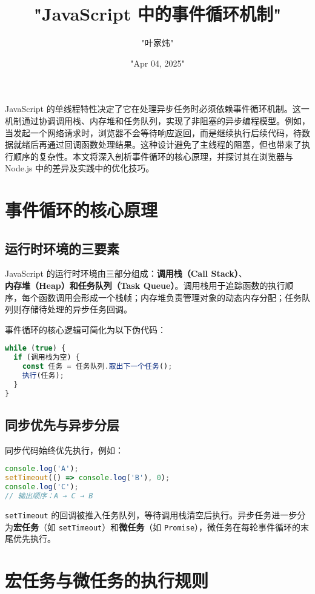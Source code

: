 \title{"JavaScript 中的事件循环机制"}
\author{"叶家炜"}
\date{"Apr 04, 2025"}
\maketitle
JavaScript 的单线程特性决定了它在处理异步任务时必须依赖事件循环机制。这一机制通过协调调用栈、内存堆和任务队列，实现了非阻塞的异步编程模型。例如，当发起一个网络请求时，浏览器不会等待响应返回，而是继续执行后续代码，待数据就绪后再通过回调函数处理结果。这种设计避免了主线程的阻塞，但也带来了执行顺序的复杂性。本文将深入剖析事件循环的核心原理，并探讨其在浏览器与 Node.js 中的差异及实践中的优化技巧。\par
\chapter{事件循环的核心原理}
\section{运行时环境的三要素}
JavaScript 的运行时环境由三部分组成：\textbf{调用栈（Call Stack）}、\textbf{内存堆（Heap）\textbf{和}任务队列（Task Queue）}。调用栈用于追踪函数的执行顺序，每个函数调用会形成一个栈帧；内存堆负责管理对象的动态内存分配；任务队列则存储待处理的异步任务回调。\par
事件循环的核心逻辑可简化为以下伪代码：\par
\begin{lstlisting}[language=javascript]
while (true) {
  if (调用栈为空) {
    const 任务 = 任务队列.取出下一个任务();
    执行(任务);
  }
}
\end{lstlisting}
\section{同步优先与异步分层}
同步代码始终优先执行，例如：\par
\begin{lstlisting}[language=javascript]
console.log('A');
setTimeout(() => console.log('B'), 0);
console.log('C');
// 输出顺序：A → C → B
\end{lstlisting}
\verb!setTimeout! 的回调被推入任务队列，等待调用栈清空后执行。异步任务进一步分为\textbf{宏任务}（如 \verb!setTimeout!）和\textbf{微任务}（如 \verb!Promise!），微任务在每轮事件循环的末尾优先执行。\par
\chapter{宏任务与微任务的执行规则}
